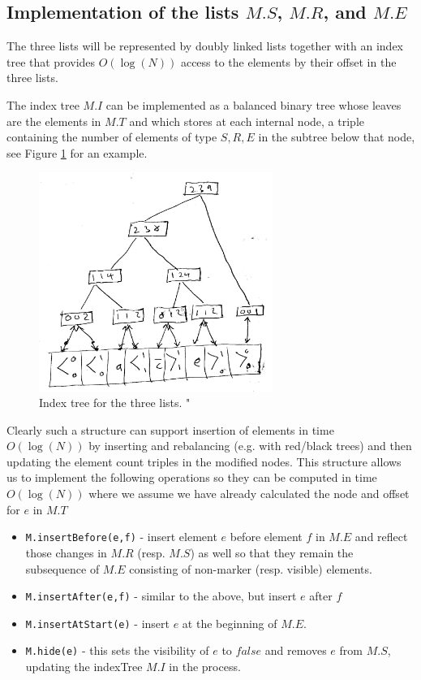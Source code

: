 \documentclass{amsart}
\begin{document}
\subsection{Implementation of the lists $M.S$, $M.R$, and $M.E$}
The three lists will be represented by doubly linked lists together with an index
tree that provides $O(\log(N))$ access to the elements by their offset in the three lists. 

The index tree $M.I$ can be implemented as a balanced binary tree whose leaves are the elements in $M.T$ and which stores at each internal node, a triple containing the number of elements of type $S,R,E$ in the subtree below that node,
see 
Figure \ref{fig:indextree} for an example. 

\begin{figure}[h]
\centering
\includegraphics[width=3.0in]{MSETfig002.jpg}
\caption{Index tree for the three lists. \label{fig:indextree}"}
\end{figure}


Clearly such a structure can support insertion of elements in time $O(\log(N))$ by inserting and rebalancing (e.g. with red/black trees) and then updating the element count triples in the modified nodes. This structure allows us to implement the following  operations so they can be computed in time $O(\log(N))$ where we assume we have already calculated the node and offset for $e$ in $M.T$
\begin{itemize}
\item {\tt M.insertBefore(e,f)} - insert element $e$ before element $f$ in $M.E$ and reflect those changes in $M.R$ (resp. $M.S$) as well so that they remain the subsequence of $M.E$ consisting of non-marker (resp. visible) elements.
\item {\tt M.insertAfter(e,f)} - similar to the above, but insert $e$ after $f$
\item {\tt M.insertAtStart(e)} - insert $e$ at the beginning of $M.E$.
\item {\tt M.hide(e)} - this sets the visibility of $e$ to $false$ and removes $e$ from $M.S$, updating the indexTree $M.I$ in the process.
\end{itemize}
\end{document}
